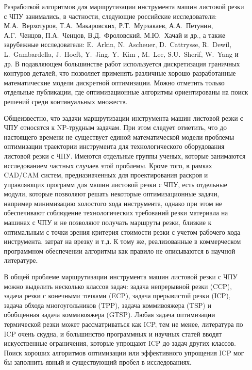 Разработкой алгоритмов для маршрутизации инструмента машин листовой резки с ЧПУ занимались,
в частности, следующие российские исследователи:
М.А.~Верхотуров, Т.А.~Макаровских, Р.Т.~Мурзакаев, А.А.~Петунин, А.Г.~Ченцов,
П.А.~Ченцов, В.Д.~Фроловский, М.Ю.~Хачай и др.,
а также зарубежные исследователи:
E.~Arkin, N.~Ascheuer, D.~Cattrysse, R.~Dewil, L.~Gambardella, J.~Hoeft, Y.~Jing, Y.~Kim , M.~Lee, S.U.~Sherif, W.~Yang и др.
В подавляющем большинстве работ
используется дискретизация граничных контуров деталей,
что позволяет применять различные хорошо разработанные математические модели дискретной оптимизации.
Можно отметить только отдельные публикации,
где оптимизационные алгоритмы ориентированы на поиск решений среди континуальных множеств.

Общеизвестно,
что задачи маршрутизации инструмента машин листовой резки с ЧПУ относятся к
NP-трудным задачам.
При этом следует отметить, что до настоящего времени не существует единой математической модели
проблемы оптимизации траектории инструмента для технологического оборудования листовой резки с ЧПУ.
Имеются отдельные группы ученых, которые занимаются исследованием частных случаев этой проблемы.
Кроме того, в рамках CAD/CAM систем,
предназначенных для проектирования раскроя и управляющих программ для машин листовой резки с ЧПУ,
есть отдельные модули, которые позволяют решать некоторые оптимизационные задачи,
например минимизацию холостого хода инструмента,
однако при этом не обеспечивают соблюдение технологических требований резки материала на машинах с ЧПУ
и не позволяют получать маршруты резки,
близкие к оптимальным с точки зрения критерия стоимости резки с учетом рабочего хода инструмента,
затрат на врезку и т.д.
К тому же, реализованные в коммерческом программном обеспечении алгоритмы
как правило не описываются в научной литературе.

В общей проблеме маршрутизации инструмента машин листовой резки с ЧПУ
можно выделить несколько классов задач:
задача непрерывной резки (CCP),
задача резки с конечными точками (ECP),
задача прерывистой резки (ICP),
задача обхода многоугольников (TPP),
задача коммивояжера (TSP)
и обобщенная задача коммивояжера (GTSP).
Любая задача оптимизации термической резки может рассматриваться как ICP,
тем не менее, литература по ICP очень скудна,
и большинство программных и научных статей вводят искусственные ограничения,
которые упрощают ICP до задач других классов.
Поиск хороших алгоритмов оптимизации или эффективного упрощения ICP
мог бы заполнить явный и существующий пробел в исследованиях.

